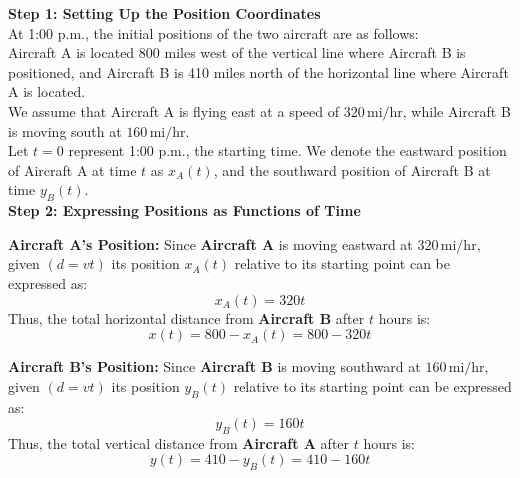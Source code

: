 \documentclass[a4paper, 12pt]{report}
\begin{document}
    \textbf{Step 1: Setting Up the Position Coordinates}\\[1em]
    At 1:00 p.m., the initial positions of the two aircraft are as follows:\\
     Aircraft A is located 800 miles west of the vertical line where Aircraft B is positioned, and Aircraft B is 410 miles north of the horizontal line where Aircraft A is located.\\[1em]
    We assume that Aircraft A is flying east at a speed of \( 320 \, \text{mi/hr} \), while Aircraft B is moving south at \( 160 \, \text{mi/hr} \).\\[1em]
    Let \( t = 0 \) represent 1:00 p.m., the starting time. We denote the eastward position of Aircraft A at time \( t \) as \( x_A(t) \), and the southward position of Aircraft B at time \( y_B(t) \).\\[1em]
    
    \textbf{Step 2: Expressing Positions as Functions of Time}\\[1em]    
    
    \begin{minipage}{0.45\textwidth}\centering
        \textbf{Aircraft A's Position:} Since \textbf{Aircraft A} is moving eastward at \( 320 \, \text{mi/hr} \), given $(d=vt)$ its position \( x_A(t) \) relative to its starting point can be expressed as:
        \[x_A(t) = 320t\]
        Thus, the total horizontal distance from \textbf{Aircraft B} after \( t \) hours is:
        \[x(t) = 800 - x_A(t) = 800 - 320t\]
    \end{minipage}\hfil
    \begin{minipage}{0.45\textwidth}\centering
        \textbf{Aircraft B's Position:} Since \textbf{Aircraft B} is moving southward at \( 160 \, \text{mi/hr} \), given $(d=vt)$ its position \( y_B(t) \) relative to its starting point can be expressed as:
        \[y_B(t) = 160t\]
        Thus, the total vertical distance from \textbf{Aircraft A} after \( t \) hours is:
        \[y(t) = 410 - y_B(t) = 410 - 160t\]
    \end{minipage}\\
    
    \newpage
\end{document}
